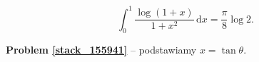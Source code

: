 %

\begin{problem_with_solution}[pytanie 155941]
    \label{stack_155941}%
    \begin{equation}
        \int_0^1 \frac{\log (1+x)}{1 + x^2} \,\mathrm{d}x = \frac \pi 8  \log 2.
    \end{equation}
\end{problem_with_solution}

\textbf{Problem \ref{stack_155941}} -- podstawiamy $x = \tan \theta$.

%